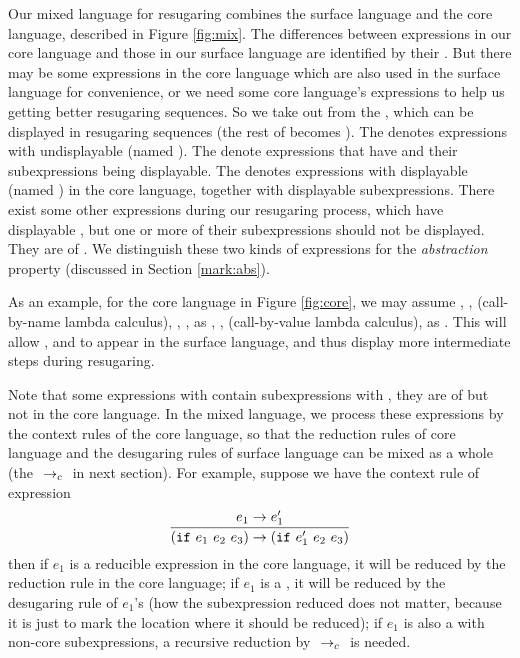 Our mixed language for resugaring combines the surface language and the core language, described in Figure \ref{fig:mix}.
%
The differences between expressions in our core language and those in our surface language are identified by their . But there may be some expressions in the core language which are also used in the surface language for convenience, or we need some core language's expressions to help us getting better resugaring sequences. So we take  out from the , which can be displayed in resugaring sequences (the rest of  becomes ). The  denotes expressions with undisplayable  (named ). The  denote expressions that have  and their subexpressions being displayable. The  denotes expressions with displayable  (named ) in the core language, together with displayable subexpressions. There exist some other expressions during our resugaring process, which have displayable , but one or more of their subexpressions should not be displayed. They are of . We distinguish these two kinds of expressions for the \emph{abstraction} property (discussed in Section \ref{mark:abs}).

As an example, for the core language in Figure \ref{fig:core},
we may assume , ,  (call-by-name lambda calculus), , ,  as , ,  (call-by-value lambda calculus),  as . This will allow ,  and  to appear in the surface language, and thus display more intermediate steps during resugaring.

Note that some expressions with  contain subexpressions with , they are of  but not in the core language. In the mixed language, we process these expressions by the context rules of the core language, so that the reduction rules of core language and the desugaring rules of surface language can be mixed as a whole (the $~\rightarrow_c~$ in next section). For example, suppose we have the context rule of  expression
\[
\infer{(\m{if}~e_1~e_2~e_3) \rightarrow (\m{if}~e_1'~e_2~e_3)}{e_1 \rightarrow e_1'}
\]
then if $e_1$ is a reducible expression in the core language, it will be reduced by the reduction rule in the core language; if $e_1$ is a , it will be reduced by the desugaring rule of $e_1$'s  (how the subexpression reduced does not matter, because it is just to mark the location where it should be reduced); if $e_1$ is also a  with non-core subexpressions, a recursive reduction by $~\rightarrow_c~$ is needed.


